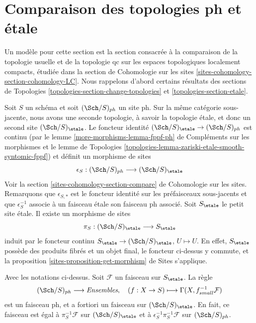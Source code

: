 \section{Comparaison des topologies ph et étale}
\label{section-ph-etale}

\noindent
Un modèle pour cette section est la section consacrée à la comparaison de la
topologie usuelle et de la topologie qc sur les espaces topologiques
localement compacts, étudiée dans la section de Cohomologie sur les sites
\ref{sites-cohomology-section-cohomology-LC}.
Nous rappelons d'abord certains résultats des
sections de Topologies
\ref{topologies-section-change-topologies} et
\ref{topologies-section-etale}.

\medskip\noindent
Soit $S$ un schéma et soit $(\Sch/S)_{ph}$ un site ph.
Sur la même catégorie sous-jacente, nous avons une seconde topologie,
à savoir la topologie étale, et donc un second site
$(\Sch/S)_\etale$. Le foncteur identité
$(\Sch/S)_\etale \to (\Sch/S)_{ph}$ est continu
(par le lemme \ref{more-morphisms-lemma-fppf-ph} de Compléments sur les morphismes
et le lemme de Topologies
\ref{topologies-lemma-zariski-etale-smooth-syntomic-fppf})
et définit un morphisme de sites
$$
\epsilon_S : (\Sch/S)_{ph} \longrightarrow (\Sch/S)_\etale
$$
Voir la section \ref{sites-cohomology-section-compare} de Cohomologie sur les sites.
Remarquons que $\epsilon_{S, *}$ est le foncteur identité sur les
préfaisceaux sous-jacents et que $\epsilon_S^{-1}$ associe à un faisceau étale son
faisceau ph associé.
Soit $S_\etale$ le petit site étale.
Il existe un morphisme de sites
$$
\pi_S : (\Sch/S)_\etale \longrightarrow S_\etale
$$
induit par le foncteur continu
$S_\etale \to (\Sch/S)_\etale$, $U \mapsto U$.
En effet, $S_\etale$ possède des produits fibrés et un objet final, le
foncteur ci-dessus y commute, et la
proposition \ref{sites-proposition-get-morphism} de Sites s'applique.

\begin{lemma}
\label{lemma-describe-pullback-pi-ph}
Avec les notations ci-dessus.
Soit $\mathcal{F}$ un faisceau sur $S_\etale$. La règle
$$
(\Sch/S)_{ph} \longrightarrow \textit{Ensembles},\quad
(f : X \to S) \longmapsto \Gamma(X, f_{small}^{-1}\mathcal{F})
$$
est un faisceau ph, et a fortiori un faisceau sur $(\Sch/S)_\etale$.
En fait, ce faisceau est égal à
$\pi_S^{-1}\mathcal{F}$ sur $(\Sch/S)_\etale$ et à
$\epsilon_S^{-1}\pi_S^{-1}\mathcal{F}$ sur $(\Sch/S)_{ph}$.
\end{lemma}

